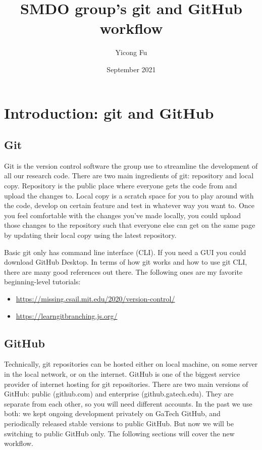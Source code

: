 \documentclass{article}
\title{SMDO group's git and GitHub workflow}
\author{Yicong Fu}
\date{September 2021}
\begin{document}
\maketitle

\section{Introduction: git and GitHub}

\subsection{Git}
Git is the version control software the group use to streamline the development of all our research code.
There are two main ingredients of git: repository and local copy.
Repository is the public place where everyone gets the code from and upload the changes to.
Local copy is a scratch space for you to play around with the code, develop on certain feature and test
in whatever way you want to.
Once you feel comfortable with the changes you've made locally, you could upload those changes to the
repository such that everyone else can get on the same page by
updating their local copy using the latest repository.

Basic git only has command line interface (CLI).
If you need a GUI you could download GitHub Desktop.
In terms of how git works and how to use git CLI, there are many good references out there. The following ones are my favorite beginning-level tutorials:

\begin{itemize}
    \item \href{https://missing.csail.mit.edu/2020/version-control/}{https://missing.csail.mit.edu/2020/version-control/}
    \item \href{https://learngitbranching.js.org/}{https://learngitbranching.js.org/}
\end{itemize}

\subsection{GitHub}

Technically, git repositories can be hosted either on local machine, on some server in the local network, or
on the internet.
GitHub is one of the biggest service provider of internet hosting for git repositories.
There are two main versions of GitHub: public (github.com) and enterprise (github.gatech.edu).
They are separate from each other, so you will need different accounts.
In the past we use both: we kept ongoing development privately on GaTech GitHub, and periodically
released stable versions to public GitHub.
But now we will be switching to public GitHub only.
The following sections will cover the new workflow.
\end{document}
